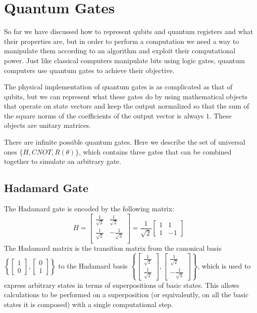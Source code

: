 \documentclass[12pt,a4paper]{report}
\theoremstyle{definition}
\theoremstyle{definition}
\theoremstyle{definition}
\begin{document}
\section{Quantum Gates}
So far we have discussed how to represent qubits and quantum registers and what their properties are, but in order to perform a computation we need a way to manipulate them according to an algorithm and exploit their computational power. Just like classical computers manipulate bits using logic gates, quantum computers use quantum gates to achieve their objective.

The physical implementation of quantum gates is as complicated as that of qubits, but we can represent what these gates do by using mathematical objects that operate on state vectors and keep the output normalized so that the sum of the square norms of the coefficients of the output vector is always $1$. These objects are unitary matrices.

There are infinite possible quantum gates. Here we describe the set of universal ones $\{H, CNOT, R(\theta)\}$, which contains three gates that can be combined together to simulate an arbitrary gate.




\subsection{Hadamard Gate}
The Hadamard gate is encoded by the following matrix:
\begin{equation*}
    H=\begin{bmatrix}
        \frac{1}{\sqrt{2}} & \frac{1}{\sqrt{2}} \\
        \frac{1}{\sqrt{2}} & -\frac{1}{\sqrt{2}} \\
    \end{bmatrix}=\frac{1}{\sqrt{2}}\begin{bmatrix}
        1 & 1 \\
        1 & -1
    \end{bmatrix}
\end{equation*}
The Hadamard matrix is the transition matrix from the canonical basis $\left\{\begin{bmatrix} 1 \\ 0\end{bmatrix}, \begin{bmatrix} 0 \\ 1\end{bmatrix}\right\}$ to the Hadamard basis $\left\{\begin{bmatrix} \frac{1}{\sqrt{2}} \\ \frac{1}{\sqrt{2}}\end{bmatrix}, \begin{bmatrix} \frac{1}{\sqrt{2}} \\ -\frac{1}{\sqrt{2}}\end{bmatrix}\right\}$, which is used to express arbitrary states in terms of superpositions of basic states. This allows calculations to be performed on a superposition (or equivalently, on all the basic states it is composed) with a single computational step.
\end{document}

